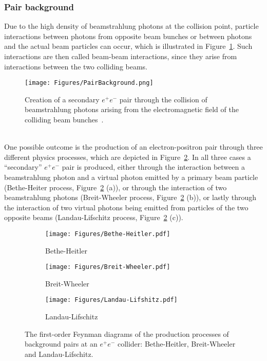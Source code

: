 \subsubsection{Pair background}
\label{BeamBeam:pairs}
Due to the high density of beamstrahlung photons at the collision point, particle interactions between photons from opposite beam bunches or between photons and the actual beam particles can occur, which is illustrated in Figure~\ref{fig:Pair_production}.
Such interactions are then called beam-beam interactions, since they arise from interactions between the two colliding beams.
\begin{figure}
\centering
\texttt{[image: Figures/PairBackground.png]}
\caption{Creation of a secondary $e^+e^-$ pair through the collision of beamstrahlung photons arising from the electromagnetic field of the colliding beam bunches~\cite[p. 29]{Vogel}.}
\label{fig:Pair_production} 
\end{figure}
\\One possible outcome is the production of an electron-positron pair through three different physics processes, which are depicted in Figure~\ref{fig:Feynman:pair_production}.
In all three cases a ``secondary'' $e^+e^-$ pair is produced, either through the interaction between a beamstrahlung photon and a virtual photon emitted by a primary beam particle (Bethe-Heiter process, Figure~\ref{fig:Feynman:pair_production} (a)),
or through the interaction of two beamstrahlung photons (Breit-Wheeler process, Figure~\ref{fig:Feynman:pair_production} (b)),
or lastly through the interaction of two virtual photons being emitted from particles of the two opposite beams (Landau-Lifschitz process, Figure~\ref{fig:Feynman:pair_production} (c)).
\begin{figure}[h]
\begin{subfigure}[b]{0.33\textwidth}
\texttt{[image: Figures/Bethe-Heitler.pdf]}
\caption{Bethe-Heitler}
\end{subfigure}
\begin{subfigure}[b]{0.33\textwidth}
\texttt{[image: Figures/Breit-Wheeler.pdf]}
\caption{Breit-Wheeler}
\end{subfigure}
\begin{subfigure}[b]{0.33\textwidth}
\texttt{[image: Figures/Landau-Lifshitz.pdf]}
\caption{Landau-Lifschitz}
\end{subfigure}
\caption[Feynman diagrams of the production of the background pairs.]{The first-order Feynman diagrams of the production processes of background pairs at an $e^+e^-$ collider: Bethe-Heitler, Breit-Wheeler and Landau-Lifschitz.}
\label{fig:Feynman:pair_production}
\end{figure}

